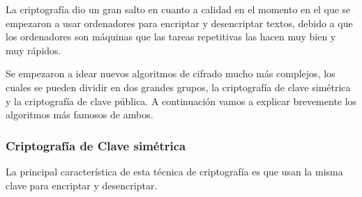 La criptografía dio un gran salto en cuanto a calidad en el momento en el que se empezaron a usar ordenadores para encriptar y desencriptar textos, debido a que los ordenadores son máquinas que las tareas repetitivas las hacen muy bien y muy rápidos.

Se empezaron a idear nuevos algoritmos de cifrado mucho más complejos, los cuales se pueden dividir en dos grandes grupos, la criptografía de clave simétrica y la criptografía de clave pública. A continuación vamos a explicar brevemente los algoritmos más famosos de ambos.

\subsubsection*{Criptografía de Clave simétrica}

La principal característica de esta técnica de criptografía es que usan la misma clave para encriptar y desencriptar.

